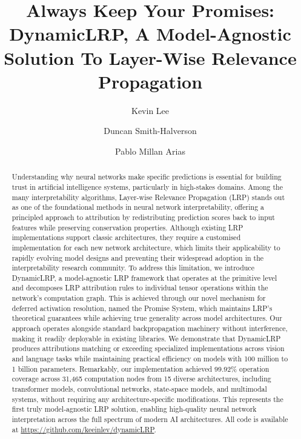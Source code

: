 \documentclass{article}
\title{Always Keep Your Promises: DynamicLRP, A Model-Agnostic Solution To Layer-Wise Relevance Propagation}
\author[1]{Kevin Lee}
\author[2, \textdagger]{Duncan Smith-Halverson}
\author[2, \textdagger]{Pablo Millan Arias}
\affil[1]{University of Waterloo}
\affil[2]{Scotiabank AI Resea—rch}
\affil[$\text{\textdagger}$]{Senior Author}
\affil[ ]{%
}
\date{}%
\begin{document}
\maketitle

\begin{abstract}
Understanding why neural networks make specific predictions is essential for building trust in artificial intelligence systems, particularly in high-stakes domains. 
Among the many interpretability algorithms, Layer-wise Relevance Propagation (LRP) stands out as one of the foundational methods in neural network interpretability, 
offering a principled approach to attribution by redistributing prediction scores back to input features while preserving conservation properties. 
Although existing LRP implementations support classic architectures, they require a customised implementation for each new network architecture, which limits
their applicability to rapidly evolving model designs and preventing their widespread adoption in the interpretability research 
community. To address this limitation, we introduce DynamicLRP, a model-agnostic LRP framework that operates at the primitive level and decomposes 
LRP attribution rules to individual tensor operations within the network's computation graph. This is achieved through our novel mechanism for 
deferred activation resolution, named the Promise System, which maintains LRP's theoretical guarantees while achieving
true generality across model architectures. Our approach operates alongside standard backpropagation machinery without interference,
making it readily deployable in existing libraries. We demonstrate that DynamicLRP produces attributions matching or exceeding specialized
implementations across vision and language tasks while maintaining practical efficiency on models with 100 million to 1 billion parameters. 
Remarkably, our implementation achieved 99.92\% operation coverage across 31,465 computation nodes from 15 diverse architectures, including
transformer models, convolutional networks, state-space models, and multimodal systems, without requiring any architecture-specific modifications. 
This represents the first truly model-agnostic LRP solution, enabling high-quality neural network interpretation across the full spectrum of modern AI
architectures. All code is available at \url{https://github.com/keeinlev/dynamicLRP}.
\end{abstract}
\end{document}
